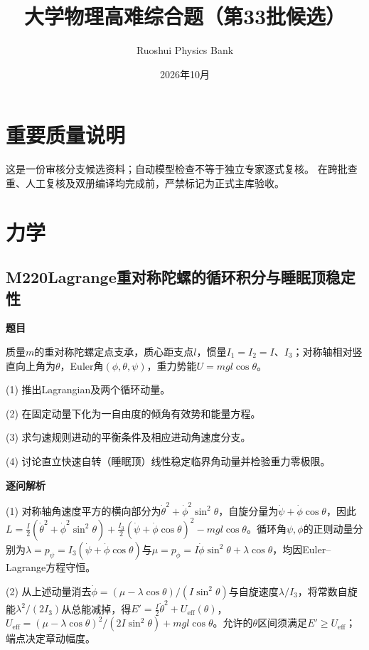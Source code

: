 \documentclass[UTF8,a4paper,11pt,oneside,openany]{ctexbook}
\begin{document}
\title{大学物理高难综合题（第33批候选）}
\author{Ruoshui Physics Bank}
\date{2026年10月}
\maketitle
\tableofcontents
\chapter*{重要质量说明}
这是一份审核分支候选资料；自动模型检查不等于独立专家逐式复核。
在跨批查重、人工复核及双册编译均完成前，严禁标记为正式主库验收。

\chapter{力学}
\section*{M220\quad Lagrange重对称陀螺的循环积分与睡眠顶稳定性}
\textbf{题目}\par
质量$m$的重对称陀螺定点支承，质心距支点$l$，惯量$I_1=I_2=I$、$I_3$；对称轴相对竖直向上角为$\theta$，Euler角$(\phi,\theta,\psi)$，重力势能$U=mgl\cos\theta$。
\par\smallskip\noindent (1) 推出Lagrangian及两个循环动量。
\par\smallskip\noindent (2) 在固定动量下化为一自由度的倾角有效势和能量方程。
\par\smallskip\noindent (3) 求匀速规则进动的平衡条件及相应进动角速度分支。
\par\smallskip\noindent (4) 讨论直立快速自转（睡眠顶）线性稳定临界角动量并检验重力零极限。
\par\medskip\textbf{逐问解析}\par
\par\smallskip\noindent (1) 对称轴角速度平方的横向部分为$\dot\theta^2+\dot\phi^2\sin^2\theta$，自旋分量为$\dot\psi+\dot\phi\cos\theta$，因此$L=\frac I2(\dot\theta^2+\dot\phi^2\sin^2\theta)+\frac{I_3}2(\dot\psi+\dot\phi\cos\theta)^2-mgl\cos\theta$。循环角$\psi,\phi$的正则动量分别为$\lambda=p_\psi=I_3(\dot\psi+\dot\phi\cos\theta)$与$\mu=p_\phi=I\dot\phi\sin^2\theta+\lambda\cos\theta$，均因Euler–Lagrange方程守恒。
\par\smallskip\noindent (2) 从上述动量消去$\dot\phi=(\mu-\lambda\cos\theta)/(I\sin^2\theta)$与自旋速度$\lambda/I_3$，将常数自旋能$\lambda^2/(2I_3)$从总能减掉，得$E'=\frac I2\dot\theta^2+U_{\mathrm{eff}}(\theta)$，$U_{\mathrm{eff}}=(\mu-\lambda\cos\theta)^2/(2I\sin^2\theta)+mgl\cos\theta$。允许的$\theta$区间须满足$E'\ge U_{\mathrm{eff}}$；端点决定章动幅度。
\end{document}
